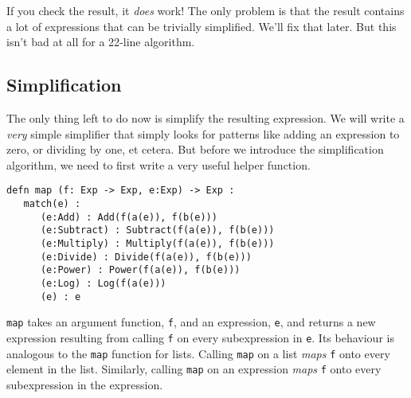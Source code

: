 \documentclass[10pt,oneside]{book}
\begin{document}
If you check the result, it {\em does} work! The only problem is that the result contains a lot of expressions that can be trivially simplified. We'll fix that later. But this isn't bad at all for a 22-line algorithm. 

\subsection*{Simplification}
The only thing left to do now is simplify the resulting expression. We will write a {\em very} simple simplifier that simply looks for patterns like adding an expression to zero, or dividing by one, et cetera. But before we introduce the simplification algorithm, we need to first write a very useful helper function. 
\begin{lstlisting}
defn map (f: Exp -> Exp, e:Exp) -> Exp :
   match(e) :
      (e:Add) : Add(f(a(e)), f(b(e)))
      (e:Subtract) : Subtract(f(a(e)), f(b(e)))
      (e:Multiply) : Multiply(f(a(e)), f(b(e)))
      (e:Divide) : Divide(f(a(e)), f(b(e)))
      (e:Power) : Power(f(a(e)), f(b(e)))
      (e:Log) : Log(f(a(e)))
      (e) : e
\end{lstlisting}
\texttt{\frenchspacing map} takes an argument function, \texttt{\frenchspacing f}, and an expression, \texttt{\frenchspacing e}, and returns a new expression resulting from calling \texttt{\frenchspacing f} on every subexpression in \texttt{\frenchspacing e}. Its behaviour is analogous to the \texttt{\frenchspacing map} function for lists. Calling \texttt{\frenchspacing map} on a list {\em maps} \texttt{\frenchspacing f} onto every element in the list. Similarly, calling \texttt{\frenchspacing map} on an expression {\em maps} \texttt{\frenchspacing f} onto every subexpression in the expression.
\end{document}
